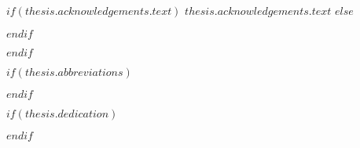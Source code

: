 \begin{acknowledgements}
\addchaptertocentry{\acknowledgementname} %
$if(thesis.acknowledgements.text)$
$thesis.acknowledgements.text$
$else$

$endif$
\end{acknowledgements}

$endif$


\begingroup
\hypersetup{linkcolor=$if(toclinkcolor)$$toclinkcolor$$else$black$endif$}

\tableofcontents %

\listoffigures %

\listoftables %

\endgroup


$if(thesis.abbreviations)$



$endif$


% 



% 


$if(thesis.dedication)$

\dedicatory{} 

$endif$


\mainmatter %

\pagestyle{thesis} %
